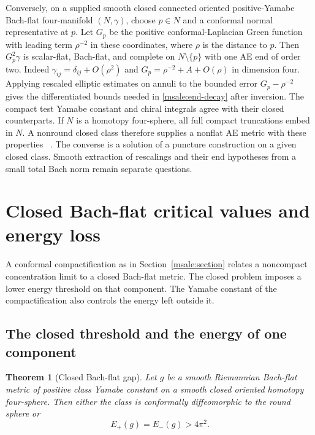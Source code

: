 \documentclass[11pt]{article}
\numberwithin{equation}{section}
\newtheorem{theorem}{Theorem}[section]
\theoremstyle{definition}
\theoremstyle{remark}
\begin{document}
Conversely, on a supplied smooth closed connected oriented
positive-Yamabe Bach-flat four-manifold \((N,\gamma)\), choose \(p\in N\) and
a conformal normal representative at \(p\). Let \(G_p\) be the
positive conformal-Laplacian Green function with leading term
\(\rho^{-2}\) in these coordinates, where \(\rho\) is the distance
to \(p\). Then \(G_p^2\gamma\) is scalar-flat, Bach-flat,
and complete on \(N\setminus\{p\}\) with one AE end of order two.
Indeed \(\gamma_{ij}=\delta_{ij}+O(\rho^2)\) and
\(G_p=\rho^{-2}+A+O(\rho)\) in dimension four. Applying rescaled
elliptic estimates on annuli to the bounded error
\(G_p-\rho^{-2}\) gives the differentiated bounds needed in
\eqref{msale:end-decay} after inversion. The compact test Yamabe
constant and chiral integrals agree with their closed
counterparts. If \(N\) is a homotopy four-sphere, all full compact
truncations embed in \(N\). A nonround closed class therefore
supplies a nonflat AE metric with these properties
~\cite[Lemma 6.4(a) and Theorem 6.5]{LeeParker1987Yamabe}.
The converse is a solution of a puncture construction on a given
closed class. Smooth extraction of rescalings and their end
hypotheses from a small total Bach norm remain separate questions.

\section{Closed Bach-flat critical values and energy loss}
\label{msgap:section}

A conformal compactification as in Section~\ref{msale:section}
relates a noncompact concentration limit to a closed Bach-flat
metric. The closed problem imposes a lower energy threshold on
that component. The Yamabe constant of the compactification also
controls the energy left outside it.

\subsection{The closed threshold and the energy of one component}

\begin{theorem}[Closed Bach-flat gap]\label{msgap:closed}
Let \(g\) be a smooth Riemannian Bach-flat metric of positive class
Yamabe constant on a smooth closed oriented homotopy four-sphere.
Then either the class is conformally diffeomorphic to the round
sphere or
\[
 E_+(g)=E_-(g)>4\pi^2.
\]
\end{theorem}
\end{document}
